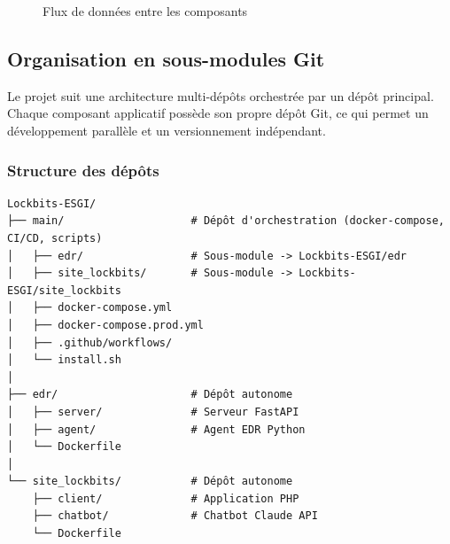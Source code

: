 \begin{figure}[H]
  \caption{Flux de données entre les composants}
  \label{fig:flux-données}
\end{figure}

\subsection{Organisation en sous-modules Git}

Le projet suit une architecture multi-dépôts orchestrée par un dépôt
principal. Chaque composant applicatif possède son propre dépôt Git, ce qui
permet un développement parallèle et un versionnement indépendant.

\subsubsection{Structure des dépôts}

\begin{verbatim}
Lockbits-ESGI/
├── main/                    # Dépôt d'orchestration (docker-compose, CI/CD, scripts)
│   ├── edr/                 # Sous-module -> Lockbits-ESGI/edr
│   ├── site_lockbits/       # Sous-module -> Lockbits-ESGI/site_lockbits
│   ├── docker-compose.yml
│   ├── docker-compose.prod.yml
│   ├── .github/workflows/
│   └── install.sh
│
├── edr/                     # Dépôt autonome
│   ├── server/              # Serveur FastAPI
│   ├── agent/               # Agent EDR Python
│   └── Dockerfile
│
└── site_lockbits/           # Dépôt autonome
    ├── client/              # Application PHP
    ├── chatbot/             # Chatbot Claude API
    └── Dockerfile
\end{verbatim}

